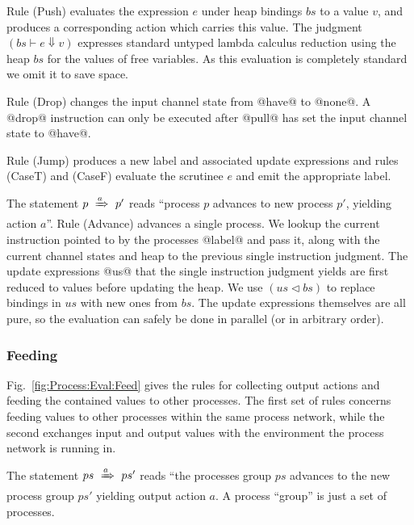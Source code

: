 Rule (Push) evaluates the expression $e$ under heap bindings $bs$ to a value $v$, and produces a corresponding action which carries this value. The judgment $(bs \vdash e \Downarrow v)$ expresses standard untyped lambda calculus reduction using the heap $bs$ for the values of free variables. As this evaluation is completely standard we omit it to save space.

Rule (Drop) changes the input channel state from @have@ to @none@. A @drop@ instruction can only be executed after @pull@ has set the input channel state to @have@. 

Rule (Jump) produces a new label and associated update expressions and rules (CaseT) and (CaseF) evaluate the scrutinee $e$ and emit the appropriate label.

The statement $p~\xRightarrow{a}~p'$ reads ``process $p$ advances to new process $p'$, yielding action $a$''. Rule (Advance) advances a single process. We lookup the current instruction pointed to by the processes @label@ and pass it, along with the current channel states and heap to the previous single instruction judgment. The update expressions @us@ that the single instruction judgment yields are first reduced to values before updating the heap. We use $(us \lhd bs)$ to replace bindings in $us$ with new ones from $bs$. The update expressions themselves are all pure, so the evaluation can safely be done in parallel (or in arbitrary order).


\subsubsection{Feeding}
Fig.~\ref{fig:Process:Eval:Feed} gives the rules for collecting output actions and feeding the contained values to other processes. The first set of rules concerns feeding values to other processes within the same process network, while the second exchanges input and output values with the environment the process network is running in.

The statement $ps~\xRightarrow{a}~ps'$ reads ``the processes group $ps$ advances to the new process group $ps'$ yielding output action $a$. A process ``group'' is just a set of processes. 


